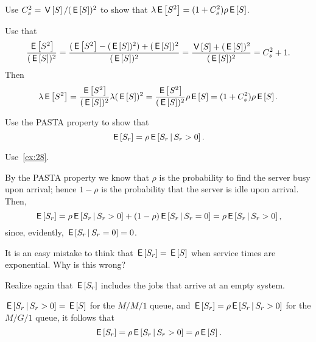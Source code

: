 \documentclass[companion]{subfiles}
\begin{document}
\begin{extra}
Use $C_s^2 = \V S / (\E S)^2$ to show that $\lambda \E{S^2} = (1+C_s^2)\rho\E S$.
\begin{solution}
Use that 
\begin{equation*}
 \frac{\E{S^2}}{(\E S)^2} = 
 \frac{(\E{S^2}-(\E S)^2) + (\E S)^2}{(\E S)^2} =
 \frac{\V S + (\E S)^2}{(\E S)^2} =
 C_s^2 + 1.
\end{equation*}
Then
\begin{equation*}
 \lambda\E{S^2} = \frac{\E{S^2}}{(\E S)^2} \lambda(\E S)^2=
 \frac{\E{S^2}}{(\E S)^2} \rho \E S = (1+C_s^2) \rho \E{S}.
\end{equation*}
\end{solution}
\end{extra}



\begin{extra}
Use the PASTA property to show that
\begin{equation}\label{eq:37}
\E{S_r} = \rho \E{S_r\given S_r>0}.
\end{equation}
\begin{hint}
 Use~\cref{ex:28}.
\end{hint}
\begin{solution}
By the PASTA property we know that $\rho$ is the probability to find the server busy upon arrival; hence $1- \rho$ is the probability that the server is idle upon arrival. Then,
\begin{equation*}
\E{S_r} = \rho \E{S_r\given S_r >0} + (1-\rho) \E{S_r\given S_r = 0} = \rho \E{S_r\given S_r>0},
\end{equation*}
since, evidently, $\E{S_r\given S_r=0}=0$. 
\end{solution}
\end{extra}

\begin{extra}
 It is an easy mistake to think that $\E{S_r} = \E S$ when service
 times are exponential. Why is this wrong?
\begin{hint}
Realize again that $\E{S_r}$ includes the jobs that arrive at an empty system.
\end{hint}
\begin{solution}

 $\E{S_r \given S_r>0} = \E S$ for the $M/M/1$ queue, and
 $\E{S_r} = \rho \E{S_r \given S_r>0}$ for the $M/G/1$ queue, it
 follows that
 \begin{equation*}
 \E{S_r} = \rho \E{S_r\given S_r>0} = \rho \E S.
 \end{equation*}
\end{solution}
\end{extra}
\end{document}
